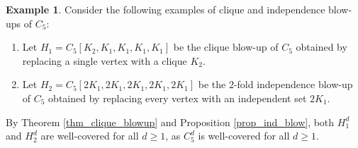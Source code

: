 \documentclass[10pt,a4paper]{amsart}
\numberwithin{equation}{section}
\theoremstyle{definition}
\newtheorem{exam}[thm]{Example}
\begin{document}
\begin{exam}\label{exam_c5_blowups}
Consider the following examples of clique and independence blow-ups of $C_5$:
\begin{enumerate}[(1)]
    \item Let $H_1 = C_5[K_2, K_1, K_1, K_1, K_1]$ be the clique blow-up of $C_5$ obtained by replacing a single vertex with a clique $K_2$.
    \item Let $H_2 = C_5[2K_1, 2K_1, 2K_1, 2K_1, 2K_1]$ be the $2$-fold independence blow-up of $C_5$ obtained by replacing every vertex with an independent set $2K_1$.
\end{enumerate}
By Theorem \ref{thm_clique_blowup} and Proposition \ref{prop_ind_blow}, both $H_1^d$ and $H_2^d$ are well-covered for all $d \ge 1$, as $C_5^d$ is well-covered for all $d \ge 1$.
\end{exam}
\end{document}
